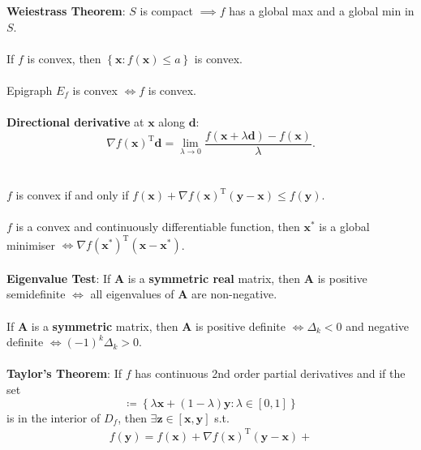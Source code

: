 \documentclass[12pt]{article}
\begin{document}
    \begin{multicols*}{3}
        \textbf{Weiestrass Theorem}: $S$ is compact $\implies f$ has a global max and a global min in $S$.
        \\\\
        If $f$ is convex, then $\left\{\bm{x} \colon f(\bm{x}) \leq a \right\}$ is convex.
        \\\\
        Epigraph $E_f$ is convex $\iff f$ is convex.
        \\\\
        \textbf{Directional derivative} at $\bm{x}$ along $\bm{d}$: 
        \begin{equation*}
            \nabla f(\bm{x})^{\mathrm{T}}\bm{d} = \lim_{\lambda \to 0}\frac{f(\bm{x} + \lambda\bm{d}) - f(\bm{x})}{\lambda}.
        \end{equation*}
        \\\\
        $f$ is convex if and only if $f(\bm{x}) + \nabla f(\bm{x})^{\mathrm{T}}(\bm{y - x}) \leq f(\bm{y})$.
        \\\\
        $f$ is a convex and continuously differentiable function, then $\bm{x}^*$ is a global minimiser $\iff \nabla f(\bm{x}^*)^{\mathrm{T}}(\bm{x - x}^*)$.
        \\\\
        \textbf{Eigenvalue Test}: If $\bm{A}$ is a \textbf{symmetric real} matrix, then $\bm{A}$ is positive semidefinite $\iff$ all eigenvalues of $\bm{A}$ are non-negative.
        \\\\
        If $\bm{A}$ is a \textbf{symmetric} matrix, then $\bm{A}$ is positive definite $\iff \Delta_k < 0$ and negative definite $\iff (-1)^k\Delta_k > 0$.
        \\\\
        \textbf{Taylor's Theorem}: If $f$ has continuous 2nd order partial derivatives and if the set
        \begin{displaymath}
            [\bm{x}, \bm{y}] \coloneqq \left\{\lambda\bm{x} + (1 - \lambda)\bm{y} \colon \lambda \in [0, 1]\right\}
        \end{displaymath}  
        is in the interior of $D_f$, then $\exists \bm{z} \in [\bm{x}, \bm{y}]$ s.t. 
        \begin{multline*}
            f(\bm{y}) = f(\bm{x}) + \nabla f(\bm{x})^{\mathrm{T}}(\bm{y - x}) + \\

\end{multline*}
\end{multicols*}
\end{document}
